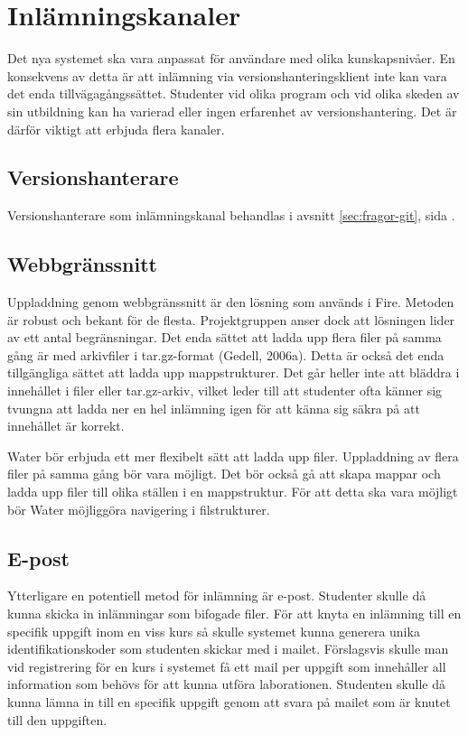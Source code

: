 \section{Inlämningskanaler}

Det nya systemet ska vara anpassat för användare med olika kunskapsnivåer. En konsekvens av detta är att inlämning via versionshanteringsklient inte kan vara det enda tillvägagångssättet. Studenter vid olika program och vid olika skeden av sin utbildning kan ha varierad eller ingen erfarenhet av versionshantering. Det är därför viktigt att erbjuda flera kanaler.

\subsection{Versionshanterare}
Versionshanterare som inlämningskanal behandlas i avsnitt \ref{sec:fragor-git}, sida \pageref{sec:fragor-git}.

\subsection{Webbgränssnitt}
Uppladdning genom webbgränssnitt är den lösning som används i Fire. Metoden är robust och bekant för de flesta. Projektgruppen anser dock att lösningen lider av ett antal begränsningar. Det enda sättet att ladda upp flera filer på samma gång är med arkivfiler i tar.gz-format (Gedell, 2006a). Detta är också det enda tillgängliga sättet att ladda upp mappstrukturer. Det går heller inte att bläddra i innehållet i filer eller tar.gz-arkiv, vilket leder till att studenter ofta känner sig tvungna att ladda ner en hel inlämning igen för att känna sig säkra på att innehållet är korrekt.

Water bör erbjuda ett mer flexibelt sätt att ladda upp filer. Uppladdning av flera filer på samma gång bör vara möjligt. Det bör också gå att skapa mappar och ladda upp filer till olika ställen i en mappstruktur. För att detta ska vara möjligt bör Water möjliggöra navigering i filstrukturer.

\subsection{E-post}
Ytterligare en potentiell metod för inlämning är e-post. Studenter skulle då kunna skicka in inlämningar som bifogade filer. För att knyta en inlämning till en specifik uppgift inom en viss kurs så skulle systemet kunna generera unika identifikationskoder som studenten skickar med i mailet. Förslagsvis skulle man vid registrering för en kurs i systemet få ett mail per uppgift som innehåller all information som behövs för att kunna utföra laborationen. Studenten skulle då kunna lämna in till en specifik uppgift genom att svara på mailet som är knutet till den uppgiften.

